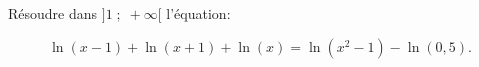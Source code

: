 \medskip

Résoudre dans $]1\;;\; +\infty[$ l'équation:

\[\ln\left (x-1\right ) + \ln \left (x+1\right ) + \ln\left (x\right ) = \ln \left (x^2-1\right) - \ln\left (0,5\right).\]

\bigskip
